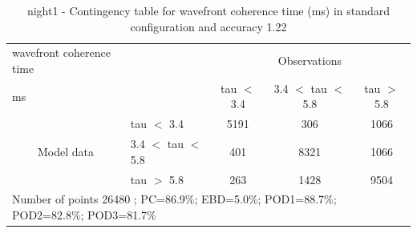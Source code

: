 \begin{table}[p!]
\begin{center}
\begin{tabular}{llccc}
\hline
{wavefront coherence time}                                       &                                                    & \multicolumn{3}{c}{Observations}                 \\
{ms}                                       &                             & tau $<$ 3.4   & 3.4 $<$ tau $<$ 5.8 & tau $>$ 5.8 \\
\hline
\multicolumn{1}{c}{\multirow{3}{*}{Model data}}  & tau $<$ 3.4             & 5191                & 306                       & 1066              \\
                                                 & 3.4  $<$ tau $<$ 5.8 & 401                & 8321                       & 1066              \\
                                                 & tau $>$ 5.8             & 263                & 1428                       & 9504              \\
\hline
\multicolumn{5}{l}{ Number of points        26480 ; PC=86.9\%; EBD=5.0\%; POD1=88.7\%; POD2=82.8\%; POD3=81.7\%}
\end{tabular}
\end{center}
\caption{night1 - Contingency table for  wavefront coherence time (ms) in standard configuration and accuracy 1.22}
\label{tab:contingencytauBEF:night1}
\end{table}
